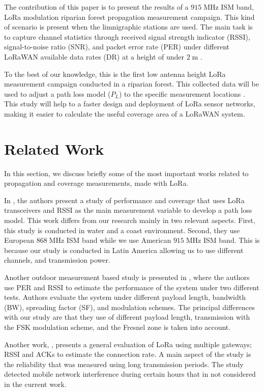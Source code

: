 The contribution of this paper is to present the results of a $915\;$MHz ISM band, LoRa modulation riparian forest propagation measurement campaign. This kind of scenario is present when the limnigraphic stations are used. The main task is to capture channel statistics through received signal strength indicator (RSSI), signal-to-noise ratio (SNR), and packet error rate (PER) under different LoRaWAN available data rates (DR) at a height of under $2\;$m \cite{N.SorninSemtechM.LuisSemtechT.EirichIBMT.KrampIBM2015}.  

To the best of our knowledge, this is the first low antenna height LoRa measurement campaign conducted in a riparian forest. This collected data will be used to adjust a path loss model ($P_L$) to the specific measurement locations \cite{Mikhaylov2016}. This study will help to a faster design and deployment of LoRa sensor networks, making it easier to calculate the useful coverage area of a LoRaWAN system.


\section{Related Work}

In this section, we discuss briefly some of the most important works related to propagation and coverage measurements, made with LoRa.

In \cite{Mikhaylov2016}, the authors present a study of performance and coverage that uses LoRa transceivers and RSSI as the main measurement variable to develop a path loss model. This work differs from our research mainly in two relevant aspects. First, this study is conducted in water and a coast environment. Second, they use European $868\;$MHz ISM band while we use American $915\;$MHz ISM band. This is because our study is conducted in Latin America allowing us to use different channels, and transmission power. 

Another outdoor measurement based study is presented in \cite{Aref2014}, where the authors use PER and RSSI to estimate the performance of the system under two different tests. Authors evaluate the system under different payload length, bandwidth (BW), spreading factor (SF), and modulation schemes. The principal differences with our study are that they use of different payload length, transmission with the FSK modulation scheme, and the Fresnel zone is taken into account.

Another work, \cite{Wixted2017}, presents a general evaluation of LoRa using multiple gateways; RSSI and ACKs to estimate the connection rate. A main aspect of the study is the reliability that was measured using long transmission periods. The study detected mobile network interference during certain hours that in not considered in the current work.

